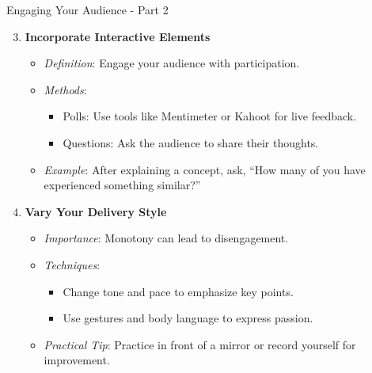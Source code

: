 \documentclass[aspectratio=169]{beamer}
\begin{document}
\begin{frame}[fragile]{Engaging Your Audience - Part 2}
    \begin{enumerate}
        \setcounter{enumi}{2}
        \item \textbf{Incorporate Interactive Elements}
        \begin{itemize}
            \item \textit{Definition}: Engage your audience with participation.
            \item \textit{Methods}:
            \begin{itemize}
                \item Polls: Use tools like Mentimeter or Kahoot for live feedback.
                \item Questions: Ask the audience to share their thoughts.
            \end{itemize}
            \item \textit{Example}: After explaining a concept, ask, “How many of you have experienced something similar?”
        \end{itemize}

        \item \textbf{Vary Your Delivery Style}
        \begin{itemize}
            \item \textit{Importance}: Monotony can lead to disengagement.
            \item \textit{Techniques}:
            \begin{itemize}
                \item Change tone and pace to emphasize key points.
                \item Use gestures and body language to express passion.
            \end{itemize}
            \item \textit{Practical Tip}: Practice in front of a mirror or record yourself for improvement.
        \end{itemize}
    \end{enumerate}
\end{frame}
\end{document}
